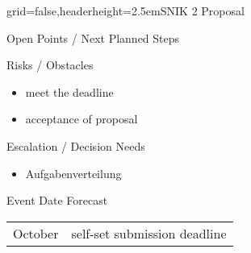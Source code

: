 \documentclass[english]{kiesgrube}
\begin{document}
\begin{poster}{grid=false,headerheight=2.5em}{}{SNIK 2 Proposal}{}{}
\begin{posterbox}[name=open,column=1,below=description]{Open Points / Next Planned Steps}
\begin{enumerate}
\end{enumerate}
\end{posterbox}
\begin{posterbox}[name=risks,column=1,below=open]{Risks / Obstacles}
\begin{itemize}
\item meet the deadline
\item acceptance of proposal 
\end{itemize}
\end{posterbox}
\begin{posterbox}[name=escalation,column=1,below=risks]{Escalation / Decision Needs}
\begin{itemize}
\item Aufgabenverteilung 
\end{itemize}
\end{posterbox}
\begin{posterbox}[name=event,below=progress,]{Event Date Forecast}
\begin{tabulary}{\textwidth}{lL}
October		&self-set submission deadline
\end{tabulary}
\end{posterbox}
\footer{}
\end{poster}

\newpage
\end{document}

